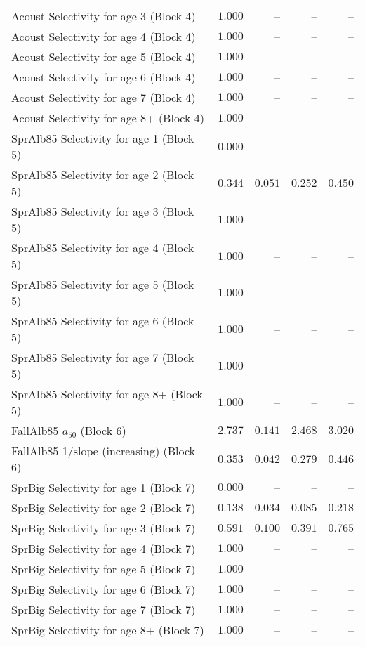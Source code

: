 \documentclass[
]{article}
\begin{document}
\begin{landscape}
\begin{longtable}[t]{lrrrr}
Acoust Selectivity for age 3 (Block 4) & $1.000$ & -- & -- & --\\
Acoust Selectivity for age 4 (Block 4) & $1.000$ & -- & -- & --\\
Acoust Selectivity for age 5 (Block 4) & $1.000$ & -- & -- & --\\
Acoust Selectivity for age 6 (Block 4) & $1.000$ & -- & -- & --\\
\addlinespace
Acoust Selectivity for age 7 (Block 4) & $1.000$ & -- & -- & --\\
Acoust Selectivity for age 8+ (Block 4) & $1.000$ & -- & -- & --\\
SprAlb85 Selectivity for age 1 (Block 5) & $0.000$ & -- & -- & --\\
SprAlb85 Selectivity for age 2 (Block 5) & $0.344$ & $0.051$ & $0.252$ & $0.450$\\
SprAlb85 Selectivity for age 3 (Block 5) & $1.000$ & -- & -- & --\\
\addlinespace
SprAlb85 Selectivity for age 4 (Block 5) & $1.000$ & -- & -- & --\\
SprAlb85 Selectivity for age 5 (Block 5) & $1.000$ & -- & -- & --\\
SprAlb85 Selectivity for age 6 (Block 5) & $1.000$ & -- & -- & --\\
SprAlb85 Selectivity for age 7 (Block 5) & $1.000$ & -- & -- & --\\
SprAlb85 Selectivity for age 8+ (Block 5) & $1.000$ & -- & -- & --\\
\addlinespace
FallAlb85 $a_{50}$ (Block 6) & $2.737$ & $0.141$ & $2.468$ & $3.020$\\
FallAlb85 1/slope (increasing) (Block 6) & $0.353$ & $0.042$ & $0.279$ & $0.446$\\
SprBig Selectivity for age 1 (Block 7) & $0.000$ & -- & -- & --\\
SprBig Selectivity for age 2 (Block 7) & $0.138$ & $0.034$ & $0.085$ & $0.218$\\
SprBig Selectivity for age 3 (Block 7) & $0.591$ & $0.100$ & $0.391$ & $0.765$\\
\addlinespace
SprBig Selectivity for age 4 (Block 7) & $1.000$ & -- & -- & --\\
SprBig Selectivity for age 5 (Block 7) & $1.000$ & -- & -- & --\\
SprBig Selectivity for age 6 (Block 7) & $1.000$ & -- & -- & --\\
SprBig Selectivity for age 7 (Block 7) & $1.000$ & -- & -- & --\\
SprBig Selectivity for age 8+ (Block 7) & $1.000$ & -- & -- & --\\

\end{longtable}
\end{landscape}
\end{document}

